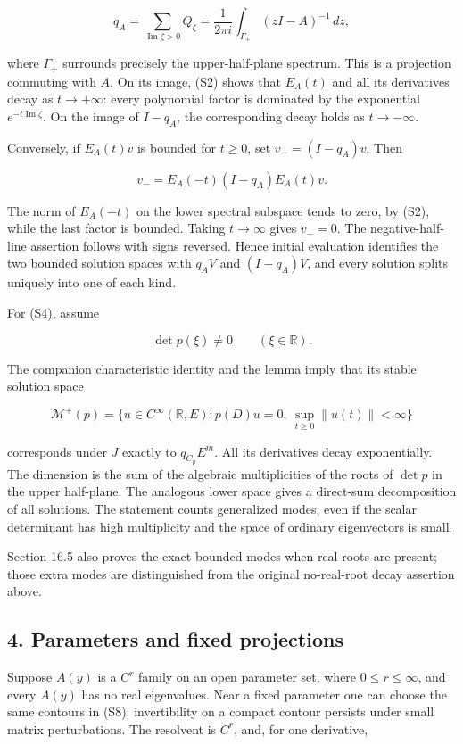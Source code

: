 \documentclass[
  11pt,
]{article}
\begin{document}
\[
q_A=\sum_{\operatorname{Im}\zeta>0}Q_\zeta
=\frac{1}{2\pi i}\int_{\Gamma_+}(zI-A)^{-1}\,dz,             \tag{S8}
\]

where \(\Gamma_+\) surrounds precisely the upper-half-plane spectrum.
This is a projection commuting with \(A\). On its image, (S2) shows that
\(E_A(t)\) and all its derivatives decay as \(t\to+\infty\): every
polynomial factor is dominated by the exponential
\(e^{-t\operatorname{Im}\zeta}\). On the image of \(I-q_A\), the
corresponding decay holds as \(t\to-\infty\).

Conversely, if \(E_A(t)v\) is bounded for \(t\geq0\), set
\(v_-=(I-q_A)v\). Then

\[
v_-=E_A(-t)(I-q_A)E_A(t)v.
\]

The norm of \(E_A(-t)\) on the lower spectral subspace tends to zero, by
(S2), while the last factor is bounded. Taking \(t\to\infty\) gives
\(v_-=0\). The negative-half-line assertion follows with signs reversed.
Hence initial evaluation identifies the two bounded solution spaces with
\(q_AV\) and \((I-q_A)V\), and every solution splits uniquely into one
of each kind.

For (S4), assume

\[
\det p(\xi)\ne0\qquad(\xi\in\mathbb R).                    \tag{S9}
\]

The companion characteristic identity and the lemma imply that its
stable solution space

\[
\mathcal M^+(p)=
\{u\in C^\infty(\mathbb R,E):p(D)u=0,
\ \sup_{t\geq0}\|u(t)\|<\infty\}
\]

corresponds under \(J\) exactly to \(q_{C_p}E^m\). All its derivatives
decay exponentially. The dimension is the sum of the algebraic
multiplicities of the roots of \(\det p\) in the upper half-plane. The
analogous lower space gives a direct-sum decomposition of all solutions.
The statement counts generalized modes, even if the scalar determinant
has high multiplicity and the space of ordinary eigenvectors is small.

Section 16.5 also proves the exact bounded modes when real roots are
present; those extra modes are distinguished from the original
no-real-root decay assertion above.

\subsection{4. Parameters and fixed
projections}\label{parameters-and-fixed-projections}

Suppose \(A(y)\) is a \(C^r\) family on an open parameter set, where
\(0\leq r\leq\infty\), and every \(A(y)\) has no real eigenvalues. Near
a fixed parameter one can choose the same contours in (S8):
invertibility on a compact contour persists under small matrix
perturbations. The resolvent is \(C^r\), and, for one derivative,
\end{document}
